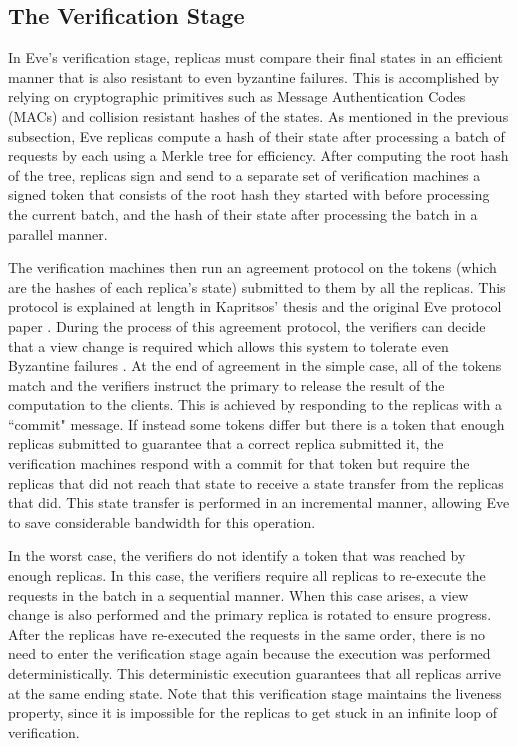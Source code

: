 \documentclass[11pt, oneside]{report}
\begin{document}
\subsection{The Verification Stage}\label{EveVerification}
In Eve's verification stage, replicas must compare their final states in an efficient manner that is also resistant to even byzantine failures. 
This is accomplished by relying on cryptographic primitives such as Message Authentication Codes (MACs) and collision resistant hashes of the states. 
As mentioned in the previous subsection, Eve replicas compute a hash of their state after processing a batch of requests by each using a Merkle tree for efficiency. 
After computing the root hash of the tree, replicas sign and send to a separate set of verification machines a signed token that consists of the root hash they started with before processing the current batch, and the hash of their state after processing the batch in a parallel manner.

The verification machines then run an agreement protocol on the tokens (which are the hashes of each replica's state) submitted to them by all the replicas. This protocol is explained at length in Kapritsos' thesis and the original Eve protocol paper \cite{manosThesis, eve}.
During the process of this agreement protocol, the verifiers can decide that a view change is required which allows this system to tolerate even Byzantine failures \cite{upRight}.
At the end of agreement in the simple case, all of the tokens  match and the verifiers instruct the primary to release the result of the computation to the clients. 
This is achieved by responding to the replicas with a ``commit" message. 
If instead some tokens differ but there is a token that enough replicas submitted to guarantee that a correct replica submitted it, the verification machines respond with a commit for that token but require the replicas that did not reach that state to receive a state transfer from the replicas that did. This state transfer is performed in an incremental manner, allowing Eve to save considerable bandwidth for this operation.

In the worst case, the verifiers do not identify a token that was reached by enough replicas. 
In this case, the verifiers require all replicas to re-execute the requests in the batch in a sequential manner. 
When this case arises, a view change is also performed and the primary replica is rotated to ensure progress.
After the replicas have re-executed the requests in the same order, there is no need to enter the verification stage again because the execution was performed deterministically. 
This deterministic execution guarantees that all replicas arrive at the same ending state.
Note that this verification stage maintains the liveness property, since it is impossible for the replicas to get stuck in an infinite loop of verification.
\end{document}
